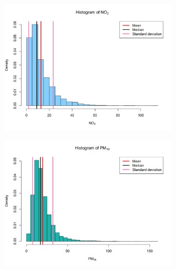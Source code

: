 \documentclass[a4paper, 10pt]{article}
\begin{document}
\begin{flushleft}
      \begin{figure}[H]
         \centering
         \begin{subfigure}[t]{0.48\linewidth}
            \centering
            \includegraphics[width=\linewidth]{../img/no2_hist_2019.png}
         \end{subfigure}
         \hfill
         \begin{subfigure}[t]{0.48\linewidth}
            \centering
            \includegraphics[width=\linewidth]{../img/pm10_hist_2019.png}
         \end{subfigure}

         \vfill


\end{figure}
\end{flushleft}
\end{document}
